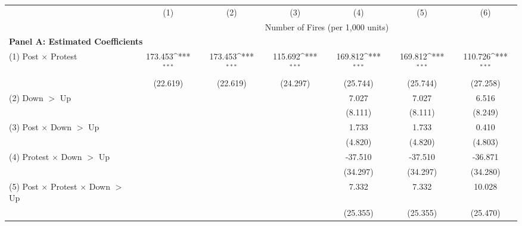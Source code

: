 {
\def\sym#1{\ifmmode^{#1}\else\(^{#1}\)\fi}
\begin{tabular}{l*{6}{c}}
\hline
            &\multicolumn{1}{c}{(1)}         &\multicolumn{1}{c}{(2)}         &\multicolumn{1}{c}{(3)}         &\multicolumn{1}{c}{(4)}         &\multicolumn{1}{c}{(5)}         &\multicolumn{1}{c}{(6)}         \\
            & \multicolumn{6}{c}{Number of Fires (per 1,000 units)} \\ \hline
\multicolumn{7}{l}{\textbf{Panel A: Estimated Coefficients}} \\ \hline
(1) Post $\times$ Protest&     173.453\sym{***}&     173.453\sym{***}&     115.692\sym{***}&     169.812\sym{***}&     169.812\sym{***}&     110.726\sym{***}\\
            &    (22.619)         &    (22.619)         &    (24.297)         &    (25.744)         &    (25.744)         &    (27.258)         \\
(2) Down $>$ Up&                     &                     &                     &       7.027         &       7.027         &       6.516         \\
            &                     &                     &                     &     (8.111)         &     (8.111)         &     (8.249)         \\
(3) Post $\times$ Down $>$ Up&                     &                     &                     &       1.733         &       1.733         &       0.410         \\
            &                     &                     &                     &     (4.820)         &     (4.820)         &     (4.803)         \\
(4) Protest $\times$ Down $>$ Up&                     &                     &                     &     -37.510         &     -37.510         &     -36.871         \\
            &                     &                     &                     &    (34.297)         &    (34.297)         &    (34.280)         \\
(5) Post $\times$ Protest $\times$ Down $>$ Up&                     &                     &                     &       7.332         &       7.332         &      10.028         \\
            &                     &                     &                     &    (25.355)         &    (25.355)         &    (25.470)         \\





\end{tabular}}
